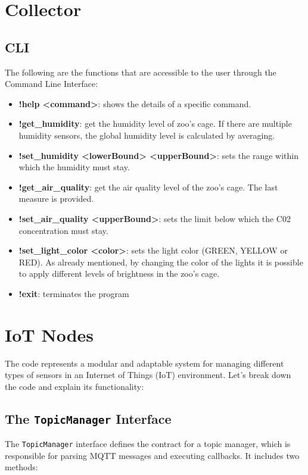 \documentclass[parskip=full]{report}
\begin{document}
\section{Collector}



\subsection{CLI}
The following are the functions that are accessible to the user through the Command Line Interface:
\begin{itemize}
	\item \textbf{!help <command>}: shows the details of a specific command. 
	\item \textbf{!get\_humidity}: get the humidity level of zoo's cage. If there are multiple humidity sensors, the
	global humidity level is calculated by averaging.
	\item \textbf{!set\_humidity <lowerBound> <upperBound>}: sets the range within which the humidity must stay.
	\item \textbf{!get\_air\_quality}: get the air quality level of the zoo's cage. The last measure is provided.
	\item \textbf{!set\_air\_quality <upperBound>}: sets the limit below which the C02 concentration must stay.
	\item \textbf{!set\_light\_color <color>}: sets the light color (GREEN, YELLOW or RED). As already mentioned, by
	changing the color of the lights it is possible to apply different levels of brightness in the zoo's cage.
	\item \textbf{!exit}: terminates the program
\end{itemize}
\section{IoT Nodes}

	
	
	The code represents a modular and adaptable system for managing different types of sensors in an Internet of Things (IoT) environment. Let's break down the code and explain its functionality:
	
	\subsection{The \texttt{TopicManager} Interface}
	
	The \texttt{TopicManager} interface defines the contract for a topic manager, which is responsible for parsing MQTT messages and executing callbacks. It includes two methods:
	
\end{document}
